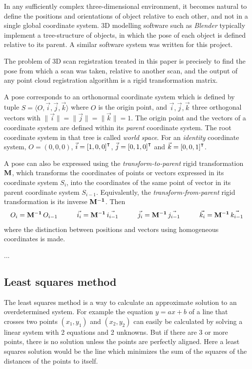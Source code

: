 In any sufficiently complex three-dimensional environment, it becomes natural to define the positions and orientations of object relative to each other, and not in a single global coordinate system. 3D modelling software such as \emph{Blender} typically implement a tree-structure of objects, in which the pose of each object is defined relative to its parent. A similar software system was written for this project.

The problem of 3D scan registration treated in this paper is precisely to find the pose from which a scan was taken, relative to another scan, and the output of any point cloud registration algorithm is a rigid transformation matrix.

A pose corresponds to an orthonormal coordinate system which is defined by tuple $S = \langle O, \vec{i}, \vec{j}, \vec{k} \rangle$ where $O$ is the origin point, and $\vec{i}, \vec{j}, \vec{k}$ three orthogonal vectors with $\|\vec{i}\| = \|\vec{j}\| = \|\vec{k}\| = 1$. The origin point and the vectors of a coordinate system are defined within its \emph{parent} coordinate system. The root coordinate system in that tree is called \emph{world space}. For an \emph{identity} coordinate system, $O = (0, 0, 0)$, $\vec{i} = \left[1, 0, 0\right]^\intercal$, $\vec{j} = \left[0, 1, 0\right]^\intercal$ and $\vec{k} = \left[0, 0, 1\right]^\intercal$.

A pose can also be expressed using the \emph{transform-to-parent} rigid transformation $\mathbf{M}$, which transforms the coordinates of points or vectors expressed in its coordinate system $S_i$, into the coordinates of the same point of vector in its parent coordinate system $S_{i-1}$. Equivalently, the \emph{transform-from-parent} rigid transformation is its inverse $\mathbf{M^{-1}}$. Then
\begin{equation}
	O_{i} = \mathbf{M^{-1}} \, O_{i-1}
	\hspace{1cm}
	\vec{i_{i}} = \mathbf{M^{-1}} \, \vec{i_{i-1}}
	\hspace{1cm}
	\vec{j_{i}} = \mathbf{M^{-1}} \, \vec{j_{i-1}}
	\hspace{1cm}
	\vec{k_{i}} = \mathbf{M^{-1}} \, \vec{k_{i-1}}
\end{equation}
where the distinction between positions and vectors using homogeneous coordinates is made.



...

\subsection{Least squares method}
The least squares method is a way to calculate an approximate solution to an overdetermined system. For example the equation $y = ax + b$ of a line that crosses two points $(x_1, y_1)$ and $(x_2, y_2)$ can easily be calculated by solving a linear system with 2 equations and 2 unknowns. But if there are 3 or more points, there is no solution unless the points are perfectly aligned. Here a least squares solution would be the line which minimizes the sum of the squares of the distances of the points to itself.

